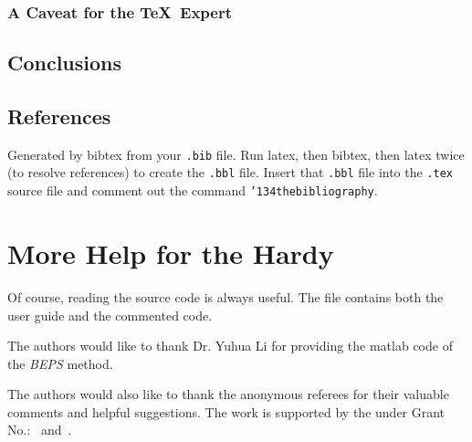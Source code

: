 \subsubsection*{A Caveat for the \TeX\ Expert}
\subsection{Conclusions}
\subsection{References}
Generated by bibtex from your \texttt{.bib} file.  Run latex,
then bibtex, then latex twice (to resolve references)
to create the \texttt{.bbl} file.  Insert that \texttt{.bbl}
file into the \texttt{.tex} source file and comment out
the command \texttt{{\char'134}thebibliography}.
\section{More Help for the Hardy}

Of course, reading the source code is always useful.  The file
 contains both the user guide and the commented
code.

\begin{acks}
  The authors would like to thank Dr. Yuhua Li for providing the
  matlab code of  the \textit{BEPS} method. 

  The authors would also like to thank the anonymous referees for
  their valuable comments and helpful suggestions. The work is
  supported by the  under Grant
  No.:~
  and~.

\end{acks}
